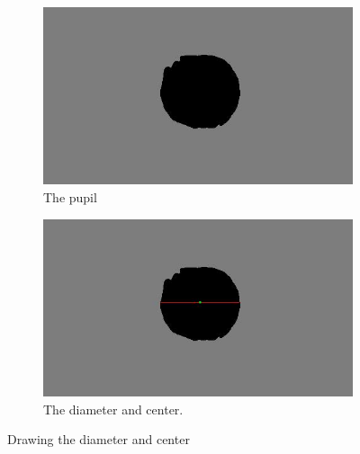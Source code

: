 \documentclass{article}
\begin{document}
%
%
\begin{figure}[H]
\centering

\begin{subfigure}{.5\textwidth}
  \centering
  \includegraphics[width=0.9\linewidth]{res/pupil/results/sobel_to_part_result.jpg}
  \caption{The pupil}
  \label{fig:original_img}
\end{subfigure}%
\begin{subfigure}{.5\textwidth}
  \centering
  \includegraphics[width=0.9\linewidth]{res/pupil/results/part_result_to_final_result.jpg}
  \caption{The diameter and center.}
  \label{fig:gray_img}
\end{subfigure}


\caption{Drawing the diameter and center}
\label{fig:result_pup_part_to_final}
\end{figure}
\end{document}
